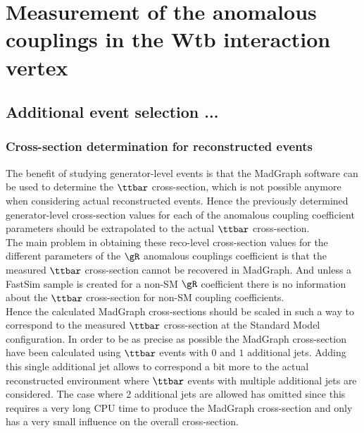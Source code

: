 \chapter{Measurement of the anomalous couplings in the Wtb interaction vertex} \label{ch::Analysis}

\section{Additional event selection ...} \label{sec::Prep}
\subsection{Cross-section determination for reconstructed events}
The benefit of studying generator-level events is that the MadGraph software can be used to determine the  $\ttbar$ cross-section, which is not possible anymore when considering actual reconstructed events. 
Hence the previously determined generator-level cross-section values for each of the anomalous coupling coefficient parameters should be extrapolated to the actual $\ttbar$ cross-section.
\\

The main problem in obtaining these reco-level cross-section values for the different parameters of the $\gR$ anomalous couplings coefficient is that the measured $\ttbar$ cross-section cannot be recovered in MadGraph. And unless a FastSim sample is created for a non-SM $\gR$ coefficient there is no information about the $\ttbar$ cross-section for non-SM coupling coefficients.
\\
Hence the calculated MadGraph cross-sections should be scaled in such a way to correspond to the measured $\ttbar$ cross-section at the Standard Model configuration. In order to be as precise as possible the MadGraph cross-section have been calculated using $\ttbar$ events with $0$ and $1$ additional jets. Adding this single additional jet allows to correspond a bit more to the actual reconstructed environment where $\ttbar$ events with multiple additional jets are considered. The case where 2 additional jets are allowed has omitted since this requires a very long CPU time to produce the MadGraph cross-section and only has a very small influence on the overall cross-section. 
\\

